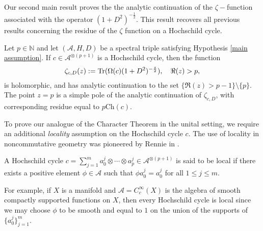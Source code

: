     Our second main result proves the the analytic continuation of the $\zeta-$function associated with the operator $(1+D^2)^{-\frac12}.$ 
    This result recovers all previous results concerning the residue of the $\zeta$ function on a Hochschild cycle.
    \begin{thm}\label{zeta thm} 
        Let $p\in\mathbb{N}$ and let $(\mathcal{A},H,D)$ be a spectral triple satisfying Hypothesis \ref{main assumption}. If $c\in\mathcal{A}^{\otimes (p+1)}$ is a Hochschild cycle, then the function
        \begin{equation}\label{zeta eq}
           \zeta_{c,D}(z) := {\rm Tr}(\Omega(c)(1+D^2)^{-\frac{z}{2}}),\quad\Re(z)>p,
        \end{equation}
        is holomorphic, and has analytic continuation to the set $\{\Re(z)>p-1\}\setminus\{p\}.$ The point $z = p$ is a simple pole of the analytic continuation of $\zeta_{c,D}$, with corresponding residue equal to $p\mathrm{Ch}(c)$.
    \end{thm}
    
    To prove our analogue of the Character Theorem in the unital setting, we require an additional \emph{locality} assumption on the Hochschild cycle $c$. The use of locality in noncommutative geometry was pioneered by Rennie in \cite{Rennie-2004}.
    \begin{defi}
        A Hochschild cycle $c=\sum_{j=1}^m a_0^j\otimes\cdots\otimes a_p^j \in \mathcal{A}^{\otimes(p+1)}$ is said to be local if there exists a positive element $\phi\in\mathcal{A}$ such that $\phi a_0^j=a_0^j$ for all $1\leq j\leq m$.
    \end{defi}
    For example, if $X$ is a manifold and $\mathcal{A} = C^\infty_c(X)$ is the algebra of smooth compactly supported functions on $X$, then every Hochschild cycle is local since we may choose $\phi$ to be smooth and equal to $1$ on the union
    of the supports of $\{a_0^j\}_{j=1}^m$.
    
